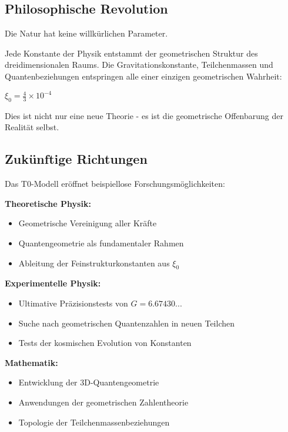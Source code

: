 \documentclass[12pt,a4paper]{article}
\newcommand{\xiconst}{\xi_0 = \frac{4}{3} \times 10^{-4}}
\theoremstyle{definition}
\begin{document}
	\subsection{Philosophische Revolution}
	
	\begin{revolutionary}
		Die Natur hat keine willkürlichen Parameter.
		
		Jede Konstante der Physik entstammt der geometrischen Struktur des dreidimensionalen Raums. Die Gravitationskonstante, Teilchenmassen und Quantenbeziehungen entspringen alle einer einzigen geometrischen Wahrheit:
		
		$\xiconst$
		
		Dies ist nicht nur eine neue Theorie - es ist die geometrische Offenbarung der Realität selbst.
	\end{revolutionary}
	
	\subsection{Zukünftige Richtungen}
	
	Das T0-Modell eröffnet beispiellose Forschungsmöglichkeiten:
	
	\textbf{Theoretische Physik:}
	\begin{itemize}
		\item Geometrische Vereinigung aller Kräfte
		\item Quantengeometrie als fundamentaler Rahmen
		\item Ableitung der Feinstrukturkonstanten aus $\xi_0$
	\end{itemize}
	
	\textbf{Experimentelle Physik:}
	\begin{itemize}
		\item Ultimative Präzisionstests von $G = 6.67430...$
		\item Suche nach geometrischen Quantenzahlen in neuen Teilchen
		\item Tests der kosmischen Evolution von Konstanten
	\end{itemize}
	
	\textbf{Mathematik:}
	\begin{itemize}
		\item Entwicklung der 3D-Quantengeometrie
		\item Anwendungen der geometrischen Zahlentheorie
		\item Topologie der Teilchenmassenbeziehungen
	\end{itemize}
	
\end{document}
